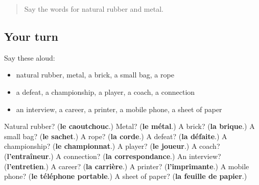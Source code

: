 \begin{quote}
Say the words for natural rubber and metal.
\end{quote}

\subsection*{Your turn}
Say these aloud:

\begin{itemize}
\raggedright
  \item natural rubber, metal, a brick, a small bag, a rope
  \item a defeat, a championship, a player, a coach, a connection
  \item an interview, a career, a printer, a mobile phone, a sheet of paper
\end{itemize}

\begin{tcolorbox}[breakable,colback=teal!4,colframe=teal!35!black,title={Before you move on}]
Natural rubber? (\textbf{le caoutchouc}.) Metal? (\textbf{le métal}.) A brick? (\textbf{la brique}.) A small bag? (\textbf{le sachet}.) A rope? (\textbf{la corde}.) A defeat? (\textbf{la défaite}.) A championship? (\textbf{le championnat}.) A player? (\textbf{le joueur}.) A coach? (\textbf{l'entraîneur}.) A connection? (\textbf{la correspondance}.) An interview? (\textbf{l'entretien}.) A career? (\textbf{la carrière}.) A printer? (\textbf{l'imprimante}.) A mobile phone? (\textbf{le téléphone portable}.) A sheet of paper? (\textbf{la feuille de papier}.)
\end{tcolorbox}
